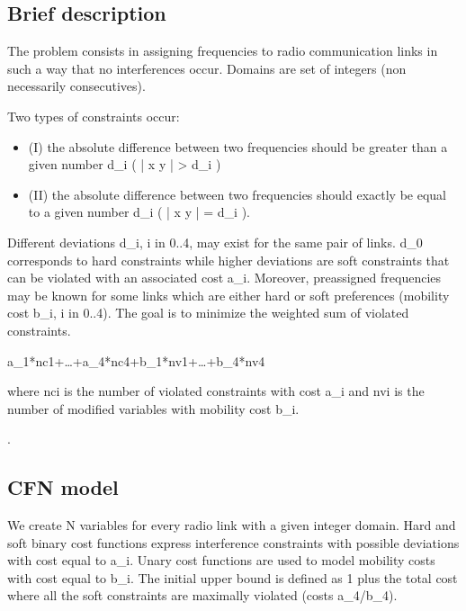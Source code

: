 \documentclass[letterpaper,10pt,openany,oneside,english]{sphinxmanual}
\begin{document}
\subsection{Brief description}
\label{\detokenize{examples/tuto_rlfap:brief-description}}
\sphinxAtStartPar
The problem consists in assigning frequencies to radio communication links in such a way that no interferences occur. Domains are set of integers (non necessarily consecutives).

\sphinxAtStartPar
Two types of constraints occur:
\begin{itemize}
\item {} 
\sphinxAtStartPar
(I) the absolute difference between two frequencies should be greater than a given number d\_i ( | x \sphinxhyphen{} y | \textgreater{} d\_i )

\item {} 
\sphinxAtStartPar
(II) the absolute difference between two frequencies should exactly be equal to a given number d\_i ( | x \sphinxhyphen{} y | = d\_i ).

\end{itemize}

\sphinxAtStartPar
Different deviations d\_i, i in 0..4, may exist for the same pair of links. d\_0 corresponds to hard constraints while higher deviations are soft constraints that can be violated with an associated cost a\_i. Moreover, pre\sphinxhyphen{}assigned frequencies may be known for some links which are either hard or soft preferences (mobility cost b\_i, i in 0..4). The goal is to minimize the weighted sum of violated constraints.
\begin{description}
\sphinxAtStartPar
a\_1*nc1+…+a\_4*nc4+b\_1*nv1+…+b\_4*nv4

\end{description}

\sphinxAtStartPar
where nci is the number of violated constraints with cost a\_i and nvi is the number of modified variables with mobility cost b\_i.

\sphinxAtStartPar
{}.


\subsection{CFN model}
\label{\detokenize{examples/tuto_rlfap:cfn-model}}
\sphinxAtStartPar
We create N variables for every radio link with a given integer domain. Hard and soft binary cost functions express interference constraints with possible deviations with cost equal to a\_i. Unary cost functions are used to model mobility costs with cost equal to b\_i. The initial upper bound is defined as 1 plus the total cost where all the soft constraints are maximally violated (costs a\_4/b\_4).
\end{document}
